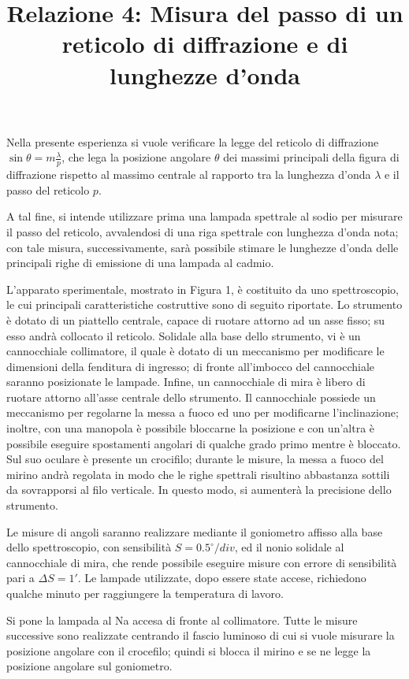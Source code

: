 \documentclass{article}
\title{Relazione 4: Misura del passo di un reticolo di diffrazione e di lunghezze d'onda}
\date{}
\begin{document}
 \maketitle	
	
Nella presente esperienza si vuole verificare la legge del reticolo di diffrazione $\sin{\theta}=m\frac{\lambda}{p}$, che lega la posizione angolare $\theta$ dei massimi principali della figura di diffrazione rispetto al massimo centrale al rapporto tra la lunghezza d'onda $\lambda$ e il passo del reticolo $p$.
	
A tal fine, si intende utilizzare prima una lampada spettrale al sodio per misurare il passo del reticolo, avvalendosi di una riga spettrale con lunghezza d'onda nota; con tale misura, successivamente, sarà possibile stimare le lunghezze d'onda delle principali righe di emissione di una lampada al cadmio.

L'apparato sperimentale, mostrato in Figura 1, è costituito da uno spettroscopio, le cui principali caratteristiche costruttive sono di seguito riportate.
Lo strumento è dotato di un piattello centrale, capace di ruotare attorno ad un asse fisso; su esso andrà collocato il reticolo.
Solidale alla base dello strumento, vi è un cannocchiale collimatore, il quale è dotato di un meccanismo per modificare le dimensioni della fenditura di ingresso; di fronte all'imbocco del cannocchiale saranno posizionate le lampade. 
Infine, un cannocchiale di mira è libero di ruotare attorno all'asse centrale dello strumento. Il cannocchiale possiede un meccanismo per regolarne la messa a fuoco ed uno per modificarne l'inclinazione; 
inoltre, con una manopola è possibile bloccarne la posizione e con un'altra è possibile eseguire spostamenti angolari di qualche grado primo mentre è bloccato.
Sul suo oculare è presente un crocifilo; durante le misure, la messa a fuoco del mirino andrà regolata in modo che le righe spettrali risultino abbastanza sottili da sovrapporsi al filo verticale. In questo modo, si aumenterà la precisione dello strumento.   

Le misure di angoli saranno realizzare mediante il goniometro affisso alla base dello spettroscopio, con sensibilità $S=0.5^{\circ} / div$, ed il nonio solidale al cannocchiale di mira, che rende possibile eseguire misure con errore di sensibilità pari a
$\Delta S = 1'$.
Le lampade utilizzate, dopo essere state accese, richiedono qualche minuto per raggiungere la temperatura di lavoro.

Si pone la lampada al Na accesa di fronte al collimatore.
Tutte le misure successive sono realizzate centrando il fascio luminoso di cui si vuole misurare la posizione angolare con il crocefilo; quindi si blocca il mirino e se ne legge la posizione angolare sul goniometro.
\end{document}
